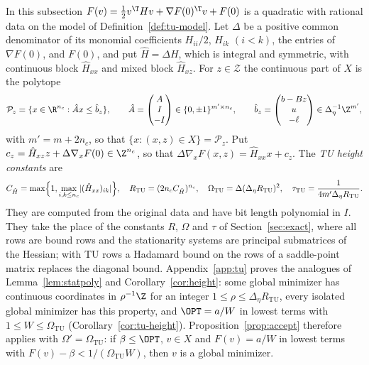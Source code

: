 In this subsection $F(v)=\frac12v^{\T}Hv+\nabla F(0)^{\T}v+F(0)$ is a
quadratic with rational data on the model of Definition~\ref{def:tu-model}.
Let $\Delta$ be a positive common denominator of its monomial coefficients
$H_{ii}/2$, $H_{ik}$ $(i<k)$, the entries of $\nabla F(0)$, and $F(0)$, and
put $\hat H=\Delta H$, which is
integral and symmetric, with continuous block $\hat H_{xx}$ and mixed block
$\hat H_{xz}$. For $z\in\mathcal Z$ the continuous part of $X$ is the polytope
\[
\mathcal P_z=\{x\in\R^{n_c}:\hat Ax\le\hat b_z\},\qquad
\hat A=\begin{pmatrix}A\\ I\\ -I\end{pmatrix}\in\{0,\pm1\}^{m'\times n_c},\qquad
\hat b_z=\begin{pmatrix}b-Bz\\ u\\ -\ell\end{pmatrix}\in\Delta_\eta^{-1}\Z^{m'},
\]
with $m'=m+2n_c$, so that $\{x:(x,z)\in X\}=\mathcal P_z$. Put
$c_z=\hat H_{xz}z+\Delta\nabla_xF(0)\in\Z^{n_c}$, so that
$\Delta\nabla_xF(x,z)=\hat H_{xx}x+c_z$. The \emph{TU height constants} are
\begin{equation}\label{eq:tu-constants}
C_{\hat H}=\max\Bigl\{1,\max_{i,k\le n_c}\lvert(\hat H_{xx})_{ik}\rvert\Bigr\},\quad
R_{\mathrm{TU}}=(2n_cC_{\hat H})^{n_c},\quad
\Omega_{\mathrm{TU}}=\Delta(\Delta_\eta R_{\mathrm{TU}})^2,\quad
\tau_{\mathrm{TU}}=\frac1{4m'\Delta_\eta R_{\mathrm{TU}}} .
\end{equation}
They are computed from the original data and have bit length polynomial in
$I$. They take the place of the constants $R$, $\Omega$ and $\tau$ of
Section~\ref{sec:exact}, where all rows are bound rows and the stationarity
systems are principal submatrices of the Hessian; with TU rows a Hadamard
bound on the rows of a saddle-point matrix replaces the diagonal bound.
Appendix~\ref{app:tu} proves the analogues of Lemma~\ref{lem:statpoly} and
Corollary~\ref{cor:height}: some global minimizer has continuous coordinates
in $\rho^{-1}\Z$ for an integer $1\le\rho\le\Delta_\eta R_{\mathrm{TU}}$, every
isolated global minimizer has this property, and $\OPT=a/W$ in lowest terms
with $1\le W\le\Omega_{\mathrm{TU}}$ (Corollary~\ref{cor:tu-height}).
Proposition~\ref{prop:accept} therefore applies with
$\Omega'=\Omega_{\mathrm{TU}}$: if $\beta\le\OPT$, $v\in X$ and $F(v)=a/W$ in
lowest terms with $F(v)-\beta<1/(\Omega_{\mathrm{TU}}W)$, then $v$ is a global
minimizer.

